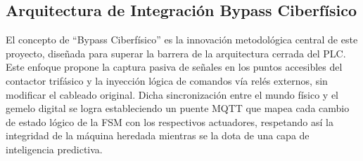 \subsection*{Arquitectura de Integración Bypass Ciberfísico}
El concepto de ``Bypass Ciberfísico'' es la innovación metodológica central de este proyecto, diseñada para superar la barrera de la arquitectura cerrada del PLC. Este enfoque propone la captura pasiva de señales en los puntos accesibles del contactor trifásico y la inyección lógica de comandos vía relés externos, sin modificar el cableado original. Dicha sincronización entre el mundo físico y el gemelo digital se logra estableciendo un puente MQTT que mapea cada cambio de estado lógico de la FSM con los respectivos actuadores, respetando así la integridad de la máquina heredada mientras se la dota de una capa de inteligencia predictiva.